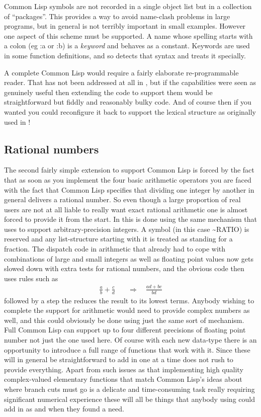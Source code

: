 Common Lisp symbols are not recorded in a single object list but in a
collection of ``packages''. This provides a way to avoid name-clash
problems in large programs, but in general is not terribly important in
small examples. However one aspect of this scheme must be supported. A name
whose spelling starts with a colon (eg {\tx :a} or {\tx :b}) is a {\em keyword}
and behaves as a constant. Keywords are used in some function definitions,
and so \vcl{} detects that syntax and treats it specially.

A complete Common Lisp would require a fairly elaborate re-programmable
reader. That has not been addressed at all in \vcl, but if the capabilities were
seen as genuinely useful then extending the code to support them would be
straightforward but fiddly and reasonably bulky code. And of course then if
you wanted you could reconfigure it back to support the lexical structure as
originally used in \vsl! 

\subsection{Rational numbers}
The second fairly simple extension to support Common Lisp is forced by the
fact that as soon as you implement the four basic arithmetic operators
you are faced with the fact that Common Lisp specifies that dividing one
integer by another in general delivers a rational number. So even though a
large proportion of real users are not at all liable to really want
exact rational arithmetic one is almost forced to provide it from the
start. In \vcl{} this is done using the same mechanism that \vsl{} uses
to support arbitrary-precision integers. A symbol (in this case
{\tx \textasciitilde{}RATIO}) is reserved and any list-structure starting with
it is treated as standing for a fraction. The dispatch code in arithmetic
that already had to cope with combinations of large and small integers
as well as floating point values now gets slowed down with extra tests for
rational numbers, and the obvious code then uses rules such as
\begin{align*}
\frac{a}{b} + \frac{c}{d} \quad & \Rightarrow \quad
\frac{a d + b c}{b d}
\end{align*}
followed by a step the reduces the result to its lowest terms. Anybody
wishing to complete the support for arithmetic would need to provide
complex numbers as well, and this could obviously be done using just the
same sort of mechanism. Full Common Lisp can support up to four different
precisions of floating point number not just the one used here. Of course
with each new data-type there is an opportunity to introduce a full range
of functions that work with it. Since these will in general be straightforward
to add in one at a time \vcl{} does not rush to provide everything. Apart from
such issues as that implementing high quality complex-valued elementary
functions that match Common Lisp's ideas about where branch cuts must go is
a delicate and time-consuming task really requiring significant numerical
experience these will all be things that anybody using \vcl{} could
add in as and when they found a need.

